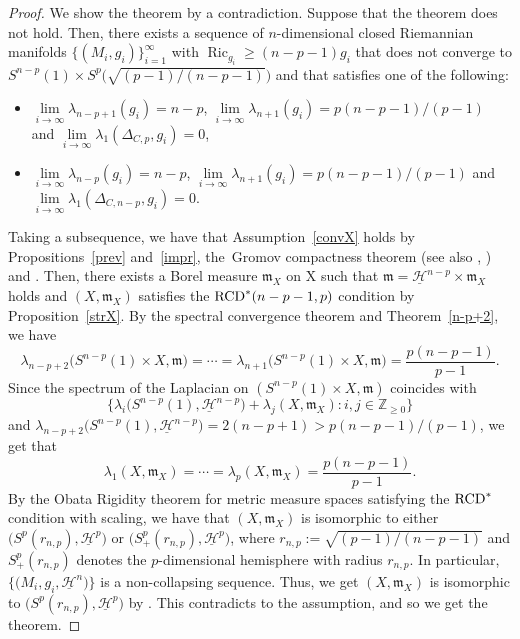 \documentclass[10pt,a4paper]{amsart}
\numberwithin{equation}{section}
\theoremstyle{definition}
\newcommand{\Ric}{\operatorname{Ric}}
\newcommand{\mf}{\mathfrak{m}}
\newcommand{\RCD}{{\rm RCD}^\ast}
\newcommand{\nHa}{\underline{\mathcal{H}}}
\begin{document}
\begin{proof}
We show the theorem by a contradiction.
Suppose that the theorem does not hold.
Then, there exists a sequence of $n$-dimensional closed Riemannian manifolds $\{(M_i,g_i)\}_{i=1}^\infty$ with $\Ric_{g_i}\geq (n-p-1)g_i$ that does not converge to $S^{n-p}(1)\times S^p\big(\sqrt{(p-1)/(n-p-1)}\big)$ and that satisfies one of the following:
\begin{itemize}\itemsep=0pt
\item $\lim\limits_{i\to\infty}\lambda_{n-p+1}(g_i)=n-p$, $\lim\limits_{i\to\infty}\lambda_{n+1}(g_i)=p(n-p-1)/(p-1)$ and $\lim\limits_{i\to \infty}\lambda_1(\Delta_{C,p},g_i)=0$,
\item $\lim\limits_{i\to\infty}\lambda_{n-p}(g_i)=n-p$, $\lim\limits_{i\to\infty}\lambda_{n+1}(g_i)=p(n-p-1)/(p-1)$ and  $\lim\limits_{i\to \infty}\lambda_1(\Delta_{C,n-p},g_i)=0$.
\end{itemize}
Taking a subsequence, we have that Assumption~\ref{convX} holds by Propositions~\ref{prev} and~\ref{impr}, the~Gromov compactness theorem (see also \cite[Theorem~11.1.10]{Pe3}, \cite[Theorem~4.54]{Ai3}) and \cite[Theorems~1.6 and~1.10]{CC1}.
Then, there exists a Borel measure $\mf_X$ on X such that $\mf=\nHa^{n-p}\times \mf_X$ holds and $(X,\mf_X)$ satisfies the $\RCD(n-p-1,p)$ condition by Proposition~\ref{strX}.
By the spectral convergence theorem \cite[Theorem~7.9]{CC3} and Theorem~\ref{n-p+2}, we have
\[
\lambda_{n-p+2}\big(S^{n-p}(1)\times X, \mf\big)=\cdots=\lambda_{n+1}\big(S^{n-p}(1)\times X, \mf\big)= \frac{p(n-p-1)}{p-1}.
\]
Since the spectrum of the Laplacian on $(S^{n-p}(1)\times X,\mf)$ coincides with
\[
\big\{\lambda_i\big(S^{n-p}(1),\nHa^{n-p}\big)+\lambda_j(X,\mf_X)\colon i,j\in\mathbb{Z}_{\geq 0}\big\}
\]
and $\lambda_{n-p+2}\big(S^{n-p}(1),\nHa^{n-p}\big)=2(n-p+1)>p(n-p-1)/(p-1)$,
we get that
\[
\lambda_1(X,\mf_X)=\cdots =\lambda_p(X,\mf_X)=\frac{p(n-p-1)}{p-1}.
\]
By the Obata Rigidity theorem for metric measure spaces satisfying the $\RCD$ condition \cite[Theorem~1.4]{Ket2} with scaling, we have that $(X,\mf_X)$ is isomorphic to either $\big(S^p(r_{n,p}),\nHa^{p}\big)$ or $\big(S^p_+(r_{n,p}),\nHa^{p}\big)$, where
$r_{n,p}:= \sqrt{(p-1)/(n-p-1)}$ and
 $S^p_+(r_{n,p})$ denotes the $p$-dimensional hemisphere with radius $r_{n,p}$.
In particular, $\big\{\big(M_i,g_i, \nHa^n\big)\big\}$ is a non-collapsing sequence.
Thus, we get $(X,\mf_X)$ is isomorphic to $\big(S^p(r_{n,p}),\nHa^{p}\big)$ by \cite[Theorem~6.2]{CC1}.
This contradicts to the assumption, and so we get the theorem.
\end{proof}
\end{document}
